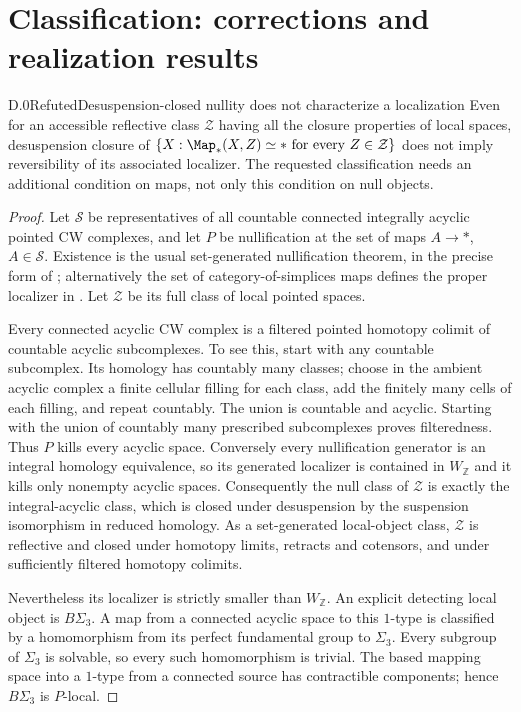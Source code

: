 \section{Classification: corrections and realization results}

\begin{claim}{D.0}{Refuted}{Desuspension-closed nullity does not characterize a localization}
Even for an accessible reflective class $\mathcal Z$ having all the closure properties of local spaces, desuspension closure of
$\{X:\Map_*(X,Z)\simeq *\text{ for every }Z\in\mathcal Z\}$
does not imply reversibility of its associated localizer. The requested classification needs an additional condition on maps, not only this condition on null objects.
\end{claim}
\begin{proof}
Let $\mathcal S$ be representatives of all countable connected integrally acyclic pointed CW complexes, and let $P$ be nullification at the set of maps $A\to *$, $A\in\mathcal S$. Existence is the usual set-generated nullification theorem, in the precise form of \citet[Theorem 1.1]{Bousfield1996ULP}; alternatively the set of category-of-simplices maps defines the proper localizer in \citet[Theorem 6.1.11]{FGHCisinski2006}. Let $\mathcal Z$ be its full class of local pointed spaces.

Every connected acyclic CW complex is a filtered pointed homotopy colimit of countable acyclic subcomplexes. To see this, start with any countable subcomplex. Its homology has countably many classes; choose in the ambient acyclic complex a finite cellular filling for each class, add the finitely many cells of each filling, and repeat countably. The union is countable and acyclic. Starting with the union of countably many prescribed subcomplexes proves filteredness. Thus $P$ kills every acyclic space. Conversely every nullification generator is an integral homology equivalence, so its generated localizer is contained in $W_{\mathbb Z}$ and it kills only nonempty acyclic spaces. Consequently the null class of $\mathcal Z$ is exactly the integral-acyclic class, which is closed under desuspension by the suspension isomorphism in reduced homology. As a set-generated local-object class, $\mathcal Z$ is reflective and closed under homotopy limits, retracts and cotensors, and under sufficiently filtered homotopy colimits.

Nevertheless its localizer is strictly smaller than $W_{\mathbb Z}$. An explicit detecting local object is $B\Sigma_3$. A map from a connected acyclic space to this $1$-type is classified by a homomorphism from its perfect fundamental group to $\Sigma_3$. Every subgroup of $\Sigma_3$ is solvable, so every such homomorphism is trivial. The based mapping space into a $1$-type from a connected source has contractible components; hence $B\Sigma_3$ is $P$-local.


\end{proof}
